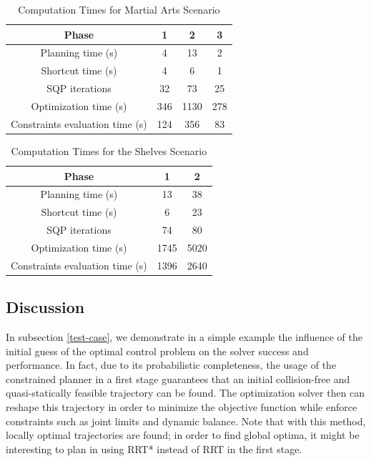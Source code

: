 \begin{table}
  \renewcommand{\arraystretch}{1.3}
  \caption{Computation Times for Martial Arts Scenario}
  \label{table-martial-art}
  \centering
  \begin{tabular}{|c||c|c|c|}
    \hline
    Phase & 1 & 2 & 3 \\
    \hline
    Planning time (s) & 4 & 13 & 2 \\
    \hline
    Shortcut time (s) & 4 & 6 & 1 \\
    \hline
    SQP iterations & 32 & 73 & 25 \\
    \hline
    Optimization time (s) & 346 & 1130 & 278 \\
    \hline
    Constraints evaluation time (s) & 124 & 356 & 83 \\
    \hline
  \end{tabular}
\end{table}

\begin{table}
  \renewcommand{\arraystretch}{1.3}
  \caption{Computation Times for the Shelves Scenario}
  \label{table-shelves}
  \centering
  \begin{tabular}{|c||c|c|}
    \hline
    Phase & 1 & 2 \\
    \hline
    Planning time (s) & 13 & 38 \\
    \hline
    Shortcut time (s) & 6 & 23 \\
    \hline
    SQP iterations & 74 & 80 \\
    \hline
    Optimization time (s) & 1745 & 5020 \\
    \hline
    Constraints evaluation time (s) & 1396 & 2640 \\
    \hline
  \end{tabular}
\end{table}

\subsection{Discussion}
\label{discussion}

In subsection \ref{test-case}, we demonstrate in a simple example the
influence of the initial guess of the optimal control problem on the
solver success and performance. In fact, due to its probabilistic
completeness, the usage of the constrained planner in a first stage
guarantees that an initial collision-free and quasi-statically
feasible trajectory can be found. The optimization solver then can
reshape this trajectory in order to minimize the objective function
while enforce constraints such as joint limits and dynamic
balance. Note that with this method, locally optimal trajectories are
found; in order to find global optima, it might be interesting to plan
in \cspace\thinspace using RRT* instead of RRT in the first stage.

